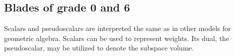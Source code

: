 
\subsection{Blades of grade 0 and 6}

Scalars and pseudoscalars are interpreted the same as in other models for geometric algebra.  Scalars can be used to represent weights.  Its dual, the pseudoscalar, may be utilized to denote the subspace volume.

